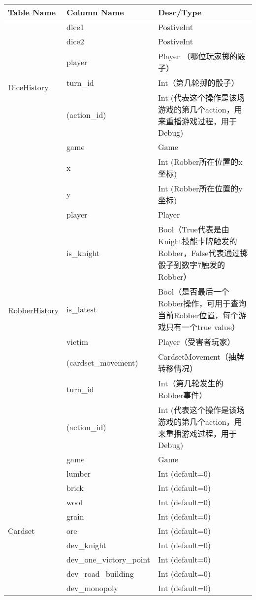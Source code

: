 \begin{longtable}{p{} | p{} p{}} \toprule
\textbf{Table Name} &\textbf{Column Name} &\textbf{Desc/Type} \\\midrule
\multirow{6}{*}{DiceHistory} &dice1 &PostiveInt \\ \cline{2-3}
&dice2 &PostiveInt \\ \cline{2-3}
&player &Player （哪位玩家掷的骰子） \\ \cline{2-3}
&turn\_id &Int（第几轮掷的骰子） \\ \cline{2-3}
&(action\_id) &Int (代表这个操作是该场游戏的第几个action，用来重播游戏过程，用于Debug) \\ \cline{2-3}
&game &Game \\ \cline{2-3}
\hline
\multirow{10}{*}{RobberHistory} &x &Int (Robber所在位置的x坐标) \\ \cline{2-3}
&y &Int (Robber所在位置的y坐标) \\ \cline{2-3}
&player &Player \\ \cline{2-3}
&is\_knight &Bool（True代表是由Knight技能卡牌触发的Robber，False代表通过掷骰子到数字7触发的Robber） \\ \cline{2-3}
&is\_latest &Bool（是否最后一个Robber操作，可用于查询当前Robber位置，每个游戏只有一个true value） \\ \cline{2-3}
&victim &Player（受害者玩家） \\ \cline{2-3}
&(cardset\_movement) &CardsetMovement（抽牌转移情况） \\ \cline{2-3}
&turn\_id &Int（第几轮发生的Robber事件） \\ \cline{2-3}
&(action\_id) &Int (代表这个操作是该场游戏的第几个action，用来重播游戏过程，用于Debug) \\ \cline{2-3}
&game &Game \\ \cline{2-3}
\hline
\multirow{10}{*}{Cardset} &lumber &Int (default=0) \\ \cline{2-3}
&brick &Int (default=0) \\ \cline{2-3}
&wool &Int (default=0) \\ \cline{2-3}
&grain &Int (default=0) \\ \cline{2-3}
&ore &Int (default=0) \\ \cline{2-3}
&dev\_knight &Int (default=0) \\ \cline{2-3}
&dev\_one\_victory\_point &Int (default=0) \\ \cline{2-3}
&dev\_road\_building &Int (default=0) \\ \cline{2-3}
&dev\_monopoly &Int (default=0) \\ \cline{2-3}

\end{longtable}
